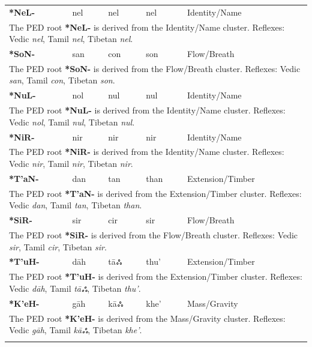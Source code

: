\begin{longtable}{p{} p{} p{} p{} p{}}
\textbf{*NeL-} & nel & nel & nel & Identity/Name \\ 
\multicolumn{5}{p{\textwidth}}{\small The PED root \textbf{*NeL-} is derived from the Identity/Name cluster. Reflexes: Vedic \textit{nel}, Tamil \textit{nel}, Tibetan \textit{nel}. } \\ \addlinespace 
\textbf{*SoN-} & san & con & son & Flow/Breath \\ 
\multicolumn{5}{p{\textwidth}}{\small The PED root \textbf{*SoN-} is derived from the Flow/Breath cluster. Reflexes: Vedic \textit{san}, Tamil \textit{con}, Tibetan \textit{son}. } \\ \addlinespace 
\textbf{*NuL-} & nol & nul & nul & Identity/Name \\ 
\multicolumn{5}{p{\textwidth}}{\small The PED root \textbf{*NuL-} is derived from the Identity/Name cluster. Reflexes: Vedic \textit{nol}, Tamil \textit{nul}, Tibetan \textit{nul}. } \\ \addlinespace 
\textbf{*NiR-} & nir & nir & nir & Identity/Name \\ 
\multicolumn{5}{p{\textwidth}}{\small The PED root \textbf{*NiR-} is derived from the Identity/Name cluster. Reflexes: Vedic \textit{nir}, Tamil \textit{nir}, Tibetan \textit{nir}. } \\ \addlinespace 
\textbf{*T'aN-} & dan & tan & than & Extension/Timber \\ 
\multicolumn{5}{p{\textwidth}}{\small The PED root \textbf{*T'aN-} is derived from the Extension/Timber cluster. Reflexes: Vedic \textit{dan}, Tamil \textit{tan}, Tibetan \textit{than}. } \\ \addlinespace 
\textbf{*SiR-} & sir & cir & sir & Flow/Breath \\ 
\multicolumn{5}{p{\textwidth}}{\small The PED root \textbf{*SiR-} is derived from the Flow/Breath cluster. Reflexes: Vedic \textit{sir}, Tamil \textit{cir}, Tibetan \textit{sir}. } \\ \addlinespace 
\textbf{*T'uH-} & dāh & tāஃ & thu' & Extension/Timber \\ 
\multicolumn{5}{p{\textwidth}}{\small The PED root \textbf{*T'uH-} is derived from the Extension/Timber cluster. Reflexes: Vedic \textit{dāh}, Tamil \textit{tāஃ}, Tibetan \textit{thu'}. } \\ \addlinespace 
\textbf{*K'eH-} & gāh & kāஃ & khe' & Mass/Gravity \\ 
\multicolumn{5}{p{\textwidth}}{\small The PED root \textbf{*K'eH-} is derived from the Mass/Gravity cluster. Reflexes: Vedic \textit{gāh}, Tamil \textit{kāஃ}, Tibetan \textit{khe'}. } \\ \addlinespace 

\end{longtable}

